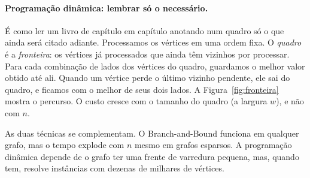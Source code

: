\paragraph{Programação dinâmica: lembrar só o necessário.} É como ler um livro de capítulo em capítulo anotando num quadro só o que ainda será citado adiante. Processamos os vértices em uma ordem fixa. O \emph{quadro} é a \emph{fronteira}: os vértices já processados que ainda têm vizinhos por processar. Para cada combinação de lados dos vértices do quadro, guardamos o melhor valor obtido até ali. Quando um vértice perde o último vizinho pendente, ele sai do quadro, e ficamos com o melhor de seus dois lados. A Figura~\ref{fig:fronteira} mostra o percurso. O custo cresce com o tamanho do quadro (a largura $w$), e não com $n$.

As duas técnicas se complementam. O Branch-and-Bound funciona em qualquer grafo, mas o tempo explode com $n$ mesmo em grafos esparsos. A programação dinâmica depende de o grafo ter uma frente de varredura pequena, mas, quando tem, resolve instâncias com dezenas de milhares de vértices.


